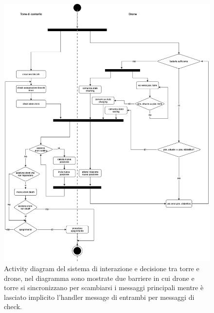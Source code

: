 \documentclass[a4paper, 11pt]{article}
\begin{document}
\begin{figure}[H]
    \centering
    \includegraphics[height = 17 cm]{image/activitiDiagram.png}
    \caption{Activity diagram del sistema di interazione e decisione tra torre e drone, nel diagramma sono mostrate due barriere in cui drone e torre si sincronizzano per scambiarsi i messaggi principali mentre è lasciato implicito l'handler message di entrambi per messaggi di check.}
    
\end{figure}


\newpage
\end{document}
